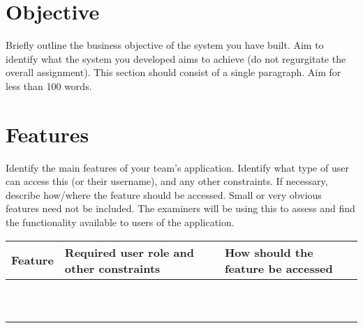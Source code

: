 \documentclass[11pt,a4paper]{article}
\begin{document}
\section*{Objective}
Briefly outline the business objective of the system you have built.  Aim to identify what the system you developed aims to achieve (do not regurgitate the overall assignment).  This section should consist of a single paragraph.  Aim for less than 100 words.


\section*{Features}
Identify the main features of your team's application.  Identify what type of user can access this (or their username), and any other constraints.  If necessary, describe how/where the feature should be accessed.  Small or very obvious features need not be included.  The examiners will be using this to assess and find the functionality available to users of the application.  

\begin{tabular}{|p{50mm}|p{40mm}|p{50mm}|}
\hline
Feature & Required user role and other constraints & How should the feature be accessed\\
\hline
 & & \\
 \hline
  & & \\
 \hline
  & & \\
 \hline
  & & \\
 \hline
  & & \\
 \hline
  & & \\
 \hline
  & & \\
 \hline
  & & \\
 \hline
  & & \\
 \hline
  & & \\
 \hline
\end{tabular}
\end{document}

